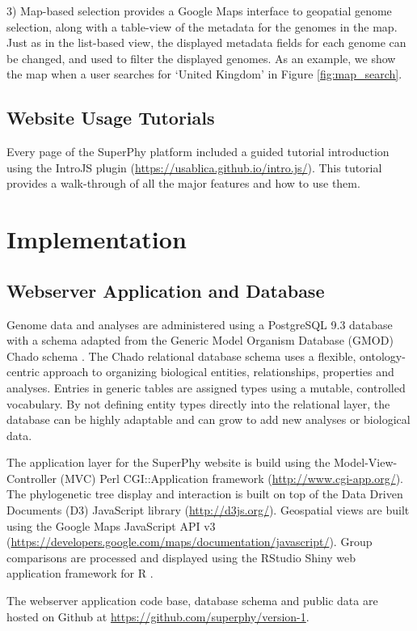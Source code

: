 \documentclass[doublespacing, linenumbers]{bmcart}
\begin{document}
 3) Map-based selection provides a Google Maps interface to geopatial genome selection, along with a table-view of the metadata for the genomes in the map. Just as in the list-based view, the displayed metadata fields for each genome can be changed, and used to filter the displayed genomes. As an example, we show the map when a user searches for `United Kingdom' in Figure \ref{fig:map_search}.

\subsection{Website Usage Tutorials}
Every page of the SuperPhy platform included a guided tutorial  introduction using the IntroJS plugin (\url{https://usablica.github.io/intro.js/}). This tutorial provides a walk-through of all the major features and how to use them.

\section{Implementation}
\subsection{Webserver Application and Database}

Genome data and analyses are administered using a PostgreSQL 9.3 database with a schema adapted from the Generic Model Organism Database (GMOD) Chado schema \cite{mungall_chado_2007}. The Chado relational database schema uses a flexible, ontology-centric approach to organizing biological entities, relationships, properties and analyses. Entries in generic tables are assigned types using a mutable, controlled vocabulary. By not defining entity types directly into the relational layer, the database can be highly adaptable and can grow to add new analyses or biological data.

The application layer for the SuperPhy website is build using the Model-View-Controller (MVC) Perl CGI::Application framework (\url{http://www.cgi-app.org/}). The phylogenetic tree display and interaction is built on top of the Data Driven Documents (D3) JavaScript library (\url{http://d3js.org/}). Geospatial views are built using the Google Maps JavaScript API v3 (\url{https://developers.google.com/maps/documentation/javascript/}). Group comparisons are processed and displayed using the RStudio Shiny web application framework for R \cite{racine_rstudio:_2012}.

The webserver application code base, database schema and public data are hosted on Github at \url{https://github.com/superphy/version-1}.
\end{document}
